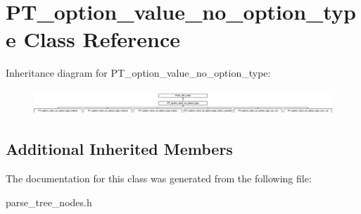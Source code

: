 \hypertarget{classPT__option__value__no__option__type}{}\section{P\+T\+\_\+option\+\_\+value\+\_\+no\+\_\+option\+\_\+type Class Reference}
\label{classPT__option__value__no__option__type}
Inheritance diagram for P\+T\+\_\+option\+\_\+value\+\_\+no\+\_\+option\+\_\+type\+:\begin{figure}[H]
\begin{center}
\leavevmode
\includegraphics[height=0.936455cm]{classPT__option__value__no__option__type}
\end{center}
\end{figure}
\subsection*{Additional Inherited Members}


The documentation for this class was generated from the following file\+:\begin{DoxyCompactItemize}
\item 
parse\+\_\+tree\+\_\+nodes.\+h\end{DoxyCompactItemize}
